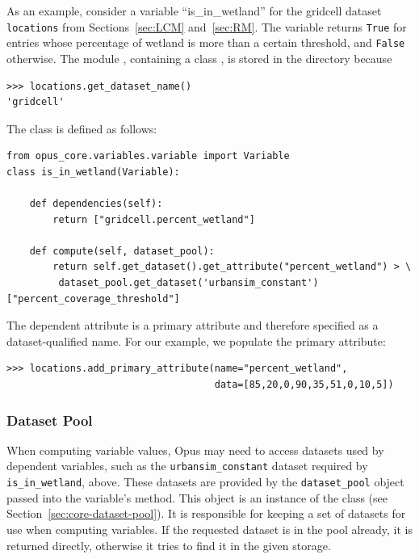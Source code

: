 As an example, consider a variable ``is_in_wetland'' for the gridcell dataset
\verb|locations| from Sections~\ref{sec:LCM} and~\ref{sec:RM}. The variable
returns \verb|True| for entries whose percentage of wetland is more than a certain
threshold, and \verb|False| otherwise. The module ,
containing a class , is stored in the directory
 because
\begin{verbatim}
>>> locations.get_dataset_name()
'gridcell'
\end{verbatim}

The class is defined as follows:
\variablesindex
\begin{verbatim}
from opus_core.variables.variable import Variable
class is_in_wetland(Variable):

    def dependencies(self):
        return ["gridcell.percent_wetland"]

    def compute(self, dataset_pool):
        return self.get_dataset().get_attribute("percent_wetland") > \
         dataset_pool.get_dataset('urbansim_constant')["percent_coverage_threshold"]

\end{verbatim}
The dependent attribute is a primary attribute and therefore specified as
a dataset-qualified name.  For our example, we populate the primary attribute:
\begin{verbatim}
>>> locations.add_primary_attribute(name="percent_wetland",
                                    data=[85,20,0,90,35,51,0,10,5])
\end{verbatim}

\subsubsection{Dataset Pool}
%
When computing variable values, Opus may need to access datasets used by
dependent variables, such as the \verb|urbansim_constant| dataset required by
\verb|is_in_wetland|, above.  These datasets are provided by the
\verb|dataset_pool| object passed into the variable's  method.
This object is an instance of the \class{DatasetPool} class (see Section~\ref{sec:core-dataset-pool}).  It is responsible
for keeping a set of datasets for use when computing
variables.  If the requested dataset is in the pool already, it is returned
directly, otherwise it tries to find it in the given storage.


